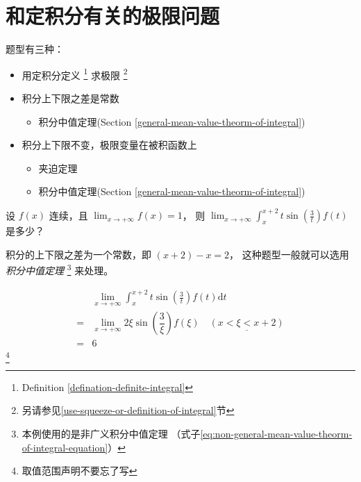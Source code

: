 \section{和定积分有关的极限问题} 
\label{limit-questions-involved-definite-integral}

题型有三种：
\begin{itemize}
    \item 用定积分定义
          \footnote{Definition \ref{defination-definite-integral}}
          求极限
          \footnote{另请参见\ref{use-squeeze-or-definition-of-integral}节}
    \item 积分上下限之差是常数
        \begin{itemize}
            \item 积分中值定理(Section
                \ref{general-mean-value-theorm-of-integral})
        \end{itemize}
    \item 积分上下限不变，极限变量在被积函数上
        \begin{itemize}
            \item 夹迫定理
            \item 积分中值定理(Section
                \ref{general-mean-value-theorm-of-integral})
        \end{itemize}
\end{itemize}

\begin{example}
    设 $f(x)$ 连续，且 $\lim_{x \to +\infty} f(x) = 1$，
    则 $\lim_{x \to +\infty} \int_x^{x+2} t \sin\left(\frac{3}{t}\right)f(t)$ 是多少？
    \cite[page 106, pdf 117]{we}

    积分的上下限之差为一个常数，即 $(x + 2) - x = 2$，
    这种题型一般就可以选用
    \emph{积分中值定理}
    \footnote{
        本例使用的是非广义积分中值定理
        （式子\ref{eq:non-general-mean-value-theorm-of-integral-equation}）
    } 来处理。

    \begin{align*} 
         &\lim_{x \to +\infty} \int_x^{x+2} t \sin\left(\frac{3}{t}\right)f(t) \mathrm{d} t\\
        =&\lim_{x \to +\infty} 2 \xi \sin \left(\dfrac{3}{\xi}\right) f(\xi) \quad \underline{(x < \xi < x+2)}\\
        =&6
    \end{align*}
    \footnote{取值范围声明不要忘了写}
\end{example}

